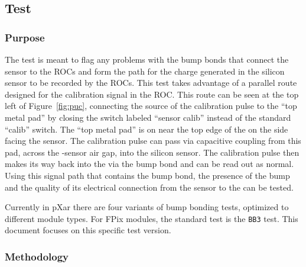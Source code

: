 
\newpage

\subsection{\bb Test}
\label{ss:bb}

\subsubsection{Purpose}

The \bb test is meant to flag any problems with the bump bonds that connect the sensor to the ROCs
and form the path for the charge generated in the silicon sensor to be recorded by the ROCs.
This test takes advantage of a parallel route designed for the calibration signal in the ROC.
This route can be seen at the top left of Figure~\ref{fig:puc}, 
connecting the source of the \vcal calibration pulse to the ``top metal pad'' 
by closing the switch labeled ``sensor calib'' instead of the standard ``calib'' switch.
The ``top metal pad'' is on near the top edge of the \roc on the side facing the sensor.
The calibration pulse can pass via capacitive coupling from this pad, 
across the \roc-sensor air gap, into the silicon sensor.
The calibration pulse then makes its way back into the \roc via the bump bond and can be read out as normal.
Using this signal path that contains the bump bond, 
the presence of the bump and the quality of its electrical connection from the sensor to the \roc can be tested.

Currently in pXar there are four variants of bump bonding tests, optimized to different module types.  
For FPix modules, the standard test is the {\tt BB3} test.
This document focuses on this specific \bb test version.

\subsubsection{Methodology}

